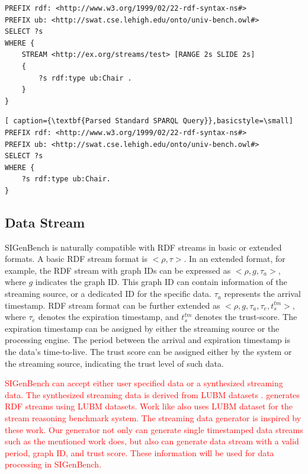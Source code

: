 \begin{lstlisting}[caption={\textbf{CQELS Query Example}},basicstyle=\small]
PREFIX rdf: <http://www.w3.org/1999/02/22-rdf-syntax-ns#>
PREFIX ub: <http://swat.cse.lehigh.edu/onto/univ-bench.owl#>
SELECT ?s 
WHERE { 
	STREAM <http://ex.org/streams/test> [RANGE 2s SLIDE 2s] 
	{ 
    	?s rdf:type ub:Chair . 
    } 
}
\end{lstlisting}

\begin{lstlisting}[ caption={\textbf{Parsed Standard SPARQL Query}},basicstyle=\small]
PREFIX rdf: <http://www.w3.org/1999/02/22-rdf-syntax-ns#>
PREFIX ub: <http://swat.cse.lehigh.edu/onto/univ-bench.owl#>
SELECT ?s
WHERE {	
	?s rdf:type ub:Chair.
}
\end{lstlisting}
%
\subsection{Data Stream}
SIGenBench is naturally compatible with RDF streams in basic or extended formats.
A basic RDF stream format is $<\rho, \tau>$.
In an extended format, for example, the RDF stream with graph IDs can be expressed as $<\rho, g, \tau_{a}>$, where $g$ indicates the graph ID. 
This graph ID can contain information of the streaming source, or a dedicated ID for the specific data. 
$\tau_{a}$ represents the arrival timestamp. 
RDF stream format can be further extended as $<\rho, g, \tau_{a}, \tau_{e}, t^{tm}_{s}>$, where $\tau_{e}$ denotes the expiration timestamp, and $t^{tm}_{s}$ denotes the trust-score.
The expiration timestamp can be assigned by either the streaming source or the processing engine.
The period between the arrival and expiration timestamp is the data's time-to-live. 
The trust score can be assigned either by the system or the streaming source, indicating the trust level of such data. 

\textcolor{red}{
SIGenBench can accept either user specified data or a synthesized streaming data.
The synthesized streaming data is derived from LUBM datasets \cite{guo2005lubm}. 
\cite{DBLP:conf/semweb/NguyenS13} generates RDF streams using LUBM datasets.
Work like \cite{tommasini2015heaven} also uses LUBM dataset for the stream reasoning benchmark system.
The streaming data generator is inspired by these work. 
Our generator not only can generate single timestamped data streams such as the mentioned work does, but also can generate data stream with a valid period, graph ID, and trust score.
These information will be used for data processing in SIGenBench.
}

